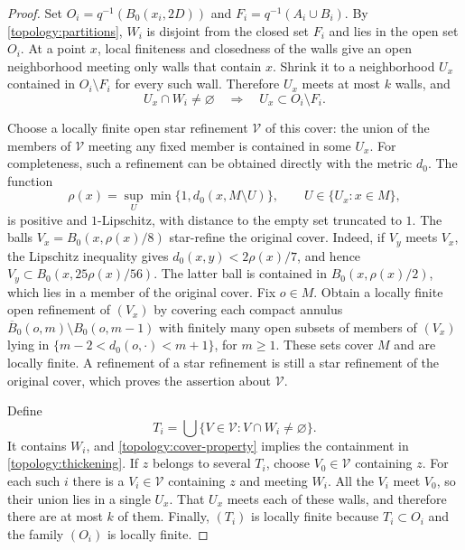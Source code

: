 \begin{proof}
Set $O_i=q^{-1}(B_0(x_i,2D))$ and
$F_i=q^{-1}(A_i\cup B_i)$.  By
\cref{topology:partitions}, $W_i$ is disjoint from the closed set $F_i$
and lies in the open set $O_i$.  At a point $x$, local finiteness and
closedness of the walls give an open neighborhood meeting only walls
that contain $x$.  Shrink it to a neighborhood $U_x$ contained in
$O_i\setminus F_i$ for every such wall.  Therefore $U_x$ meets at most
$k$ walls, and
\begin{equation}\label{topology:cover-property}
 U_x\cap W_i\ne\varnothing\quad\Longrightarrow\quad
 U_x\subset O_i\setminus F_i.
\end{equation}

Choose a locally finite open star refinement $\mathcal V$ of this
cover: the union of the members of $\mathcal V$ meeting any fixed
member is contained in some $U_x$.  For completeness, such a refinement
can be obtained directly with the metric $d_0$.  The function
\[
 \rho(x)=\sup_U\min\{1,d_0(x,M\setminus U)\},
 \qquad U\in\{U_x:x\in M\},
\]
is positive and $1$-Lipschitz, with distance to the empty set truncated
to $1$.  The balls $V_x=B_0(x,\rho(x)/8)$ star-refine the original
cover.  Indeed, if $V_y$ meets $V_x$, the Lipschitz inequality gives
$d_0(x,y)<2\rho(x)/7$, and hence
$V_y\subset B_0(x,25\rho(x)/56)$.  The latter ball is contained in
$B_0(x,\rho(x)/2)$, which lies in a member of the original cover.
Fix $o\in M$.  Obtain a locally finite open refinement of $(V_x)$ by covering each
compact annulus
$\overline B_0(o,m)\setminus B_0(o,m-1)$ with finitely many open subsets
of members of $(V_x)$ lying in
$\{m-2<d_0(o,\cdot)<m+1\}$, for $m\ge1$.
These sets cover $M$ and are locally finite.  A refinement of a star
refinement is still a star refinement of the original cover, which
proves the assertion about $\mathcal V$.

Define
\[
 T_i=\bigcup\{V\in\mathcal V:V\cap W_i\ne\varnothing\}.
\]
It contains $W_i$, and \eqref{topology:cover-property} implies the
containment in \eqref{topology:thickening}.  If $z$ belongs to several
$T_i$, choose $V_0\in\mathcal V$ containing $z$.  For each such $i$
there is a $V_i\in\mathcal V$ containing $z$ and meeting $W_i$.
All the $V_i$ meet $V_0$, so their union lies in a single $U_x$.
That $U_x$ meets each of these walls, and therefore there are at most
$k$ of them.  Finally, $(T_i)$ is locally finite because $T_i\subset O_i$
and the family $(O_i)$ is locally finite.
\end{proof}

